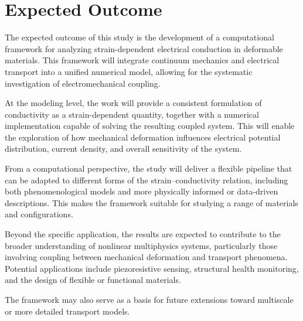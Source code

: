 \section{Expected Outcome}

The expected outcome of this study is the development of a computational framework for analyzing strain-dependent electrical conduction 
in deformable materials. This framework will integrate continuum mechanics and electrical transport into a unified numerical model, 
allowing for the systematic investigation of electromechanical coupling.

At the modeling level, the work will provide a consistent formulation of conductivity as a strain-dependent quantity, 
together with a numerical implementation capable of solving the resulting coupled system. 
This will enable the exploration of how mechanical deformation influences electrical potential distribution, 
current density, and overall sensitivity of the system.

From a computational perspective, the study will deliver a flexible pipeline that can be adapted to different forms of the 
strain–conductivity relation, including both phenomenological models and more physically informed or data-driven descriptions. 
This makes the framework suitable for studying a range of materials and configurations.

Beyond the specific application, the results are expected to contribute to the broader understanding of nonlinear multiphysics systems, 
particularly those involving coupling between mechanical deformation and transport phenomena. 
Potential applications include piezoresistive sensing, structural health monitoring, and the design of flexible or functional materials.

The framework may also serve as a basis for future extensions toward multiscale or more detailed transport models.